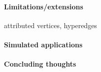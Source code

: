 \paragraph{Limitations/extensions}

attributed vertices, hyperedges

\paragraph{Simulated applications}

\paragraph{Concluding thoughts}





